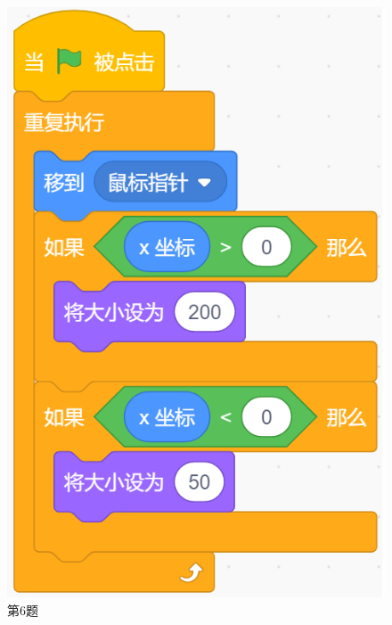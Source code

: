 \documentclass[10pt, a4paper]{article}
\begin{document}
\begin{enumerate}
        \begin{figure}[htbp]
            \centering
            \begin{minipage}[t]{.15\textwidth}
                \centering
                \includegraphics[width=\textwidth]{6.png}
                \caption*{第6题}
            \end{minipage}
            \begin{minipage}[t]{.17\textwidth}
                \centering

\end{minipage}
\end{figure}
\end{enumerate}
\end{document}
